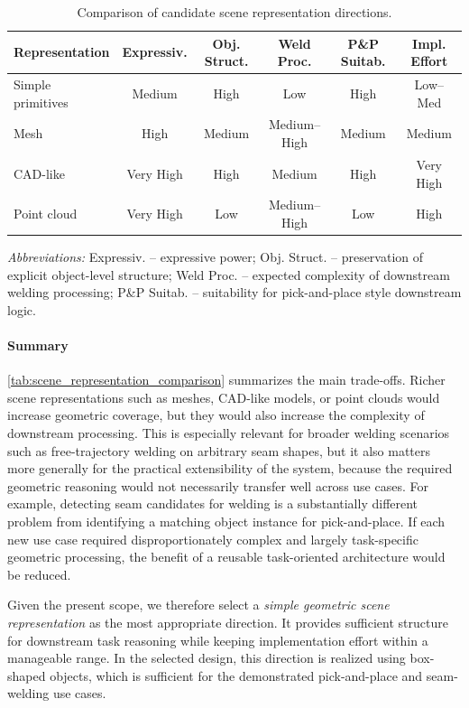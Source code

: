 \begin{table}[t]
\centering
\caption{Comparison of candidate scene representation directions.}
\label{tab:scene_representation_comparison}

\footnotesize
\setlength{\tabcolsep}{3pt}

\begin{tabular}{@{}l c c c c c@{}}
\toprule
Representation & Expressiv. & Obj. Struct. & Weld Proc. & P\&P Suitab. & Impl. Effort \\
\midrule
Simple primitives & Medium & High & Low & High & Low--Med \\
Mesh & High & Medium & Medium--High & Medium & Medium \\
CAD-like & Very High & High & Medium & High & Very High \\
Point cloud & Very High & Low & Medium--High & Low & High \\
\bottomrule
\end{tabular}

\vspace{0.4em}
\footnotesize
\emph{Abbreviations:}
Expressiv. -- expressive power;
Obj. Struct. -- preservation of explicit object-level structure;
Weld Proc. -- expected complexity of downstream welding processing;
P\&P Suitab. -- suitability for pick-and-place style downstream logic.
\end{table}

\paragraph{Summary}
\autoref{tab:scene_representation_comparison} summarizes the main trade-offs. Richer scene representations such as meshes, CAD-like models, or point clouds would increase geometric coverage, but they would also increase the complexity of downstream processing. This is especially relevant for broader welding scenarios such as free-trajectory welding on arbitrary seam shapes, but it also matters more generally for the practical extensibility of the system, because the required geometric reasoning would not necessarily transfer well across use cases. For example, detecting seam candidates for welding is a substantially different problem from identifying a matching object instance for pick-and-place. If each new use case required disproportionately complex and largely task-specific geometric processing, the benefit of a reusable task-oriented architecture would be reduced.

Given the present scope, we therefore select a \emph{simple geometric scene representation} as the most appropriate direction. It provides sufficient structure for downstream task reasoning while keeping implementation effort within a manageable range. In the selected design, this direction is realized using box-shaped objects, which is sufficient for the demonstrated pick-and-place and seam-welding use cases.


